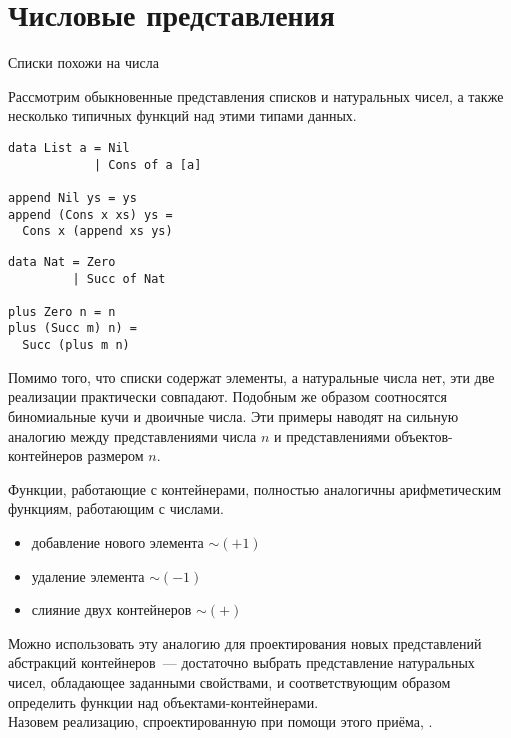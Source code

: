 
\section{Числовые представления}

\begin{frame}[fragile]{Списки похожи на числа}

Рассмотрим обыкновенные представления списков и натуральных чисел, а
также несколько типичных функций над этими типами данных.\vspace{.5cm}

\begin{minipage}{.48\textwidth}
\begin{verbatim}
data List a = Nil
            | Cons of a [a]
  
append Nil ys = ys          
append (Cons x xs) ys =      
  Cons x (append xs ys)
\end{verbatim}
\end{minipage}
\begin{minipage}{.48\textwidth}
\begin{verbatim}
data Nat = Zero
         | Succ of Nat
 
plus Zero n = n
plus (Succ m) n) =
  Succ (plus m n)
\end{verbatim}
\end{minipage}\vspace{.5cm}

Помимо того, что списки содержат элементы, а натуральные числа нет,
эти две реализации практически совпадают. Подобным же образом
соотносятся биномиальные кучи и двоичные числа. Эти примеры наводят на
сильную аналогию между представлениями числа $n$ и представлениями
объектов-контейнеров размером $n$. 

\end{frame}

\begin{frame}[fragile]{}

Функции, работающие с контейнерами,
полностью аналогичны арифметическим функциям, работающим с
числами. 
\begin{itemize}
  \item  добавление нового элемента $\sim (+1)$ 
  \item удаление элемента $\sim (-1)$ 
  \item слияние двух контейнеров $\sim (+)$ 
\end{itemize}
 

Можно использовать эту аналогию для проектирования новых
представлений абстракций контейнеров~--- достаточно выбрать
представление натуральных чисел, обладающее заданными свойствами, и
соответствующим образом определить функции над
объектами-контейнерами. \\

Назовем реализацию, спроектированную при помощи
этого приёма, .

\end{frame}

